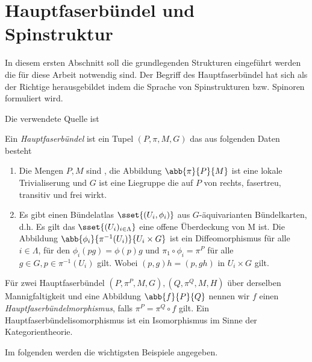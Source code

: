 

\section{Hauptfaserbündel und Spinstruktur}

In diesem ersten Abschnitt soll die grundlegenden Strukturen eingeführt werden die für diese Arbeit notwendig sind. Der Begriff des Hauptfaserbündel hat sich als der Richtige herausgebildet indem die Sprache von Spinstrukturen bzw. Spinoren formuliert wird.

Die verwendete Quelle ist \cite{baum09}

\begin{Def}[Hauptfaserbündel]
	Ein \textit{Hauptfaserbündel} ist ein Tupel $(P,\pi,M,G)$ das aus folgenden Daten besteht
	\begin{enumerate}[\textbullet]
		\item Die Mengen $P,M$ sind \mfgen, die Abbildung $ \abb{\pi}{P}{M} $ ist eine lokale Trivialiserung und $G$ ist eine Liegruppe
		die auf $P$ von rechts, fasertreu, transitiv und frei wirkt. 
		\item Es gibt einen Bündelatlas $\sset{(U_i,\phi_i)}$ aus $G$-äquivarianten Bündelkarten, d.h.
		Es gilt das $\sset{(U_i)_{i \in \Lambda}}$ eine offene
		Überdeckung von M ist. Die Abbildung $ \abb{\phi_i}{\pi^{-1}(U_i)}{U_i\times G} $ ist ein
		Diffeomorphismus für alle $i \in \Lambda $, für den $ \phi_i(pg) = \phi(p) g  $ und $ \pi_1 \circ \phi_i = \pi^P $ für alle $ g \in G, p \in \pi^{-1}(U_i) $ gilt. Wobei $ (p,g) h = (p,gh) $ in 
		$ U_i\times G $ gilt. 
	\end{enumerate}		
	Für zwei Hauptfaserbündel $(P,\pi^P,M,G),(Q,\pi^Q,M,H)$ 
	über derselben Mannigfaltigkeit und eine Abbildung $\abb{f}{P}{Q}$ nennen wir $f$ einen \textit{Hauptfaserbündelmorphismus}, falls $ \pi^P=\pi^Q \circ f $ gilt. Ein Hauptfaserbündelisomorphismus ist
	ein Isomorphismus im Sinne der Kategorientheorie.
\end{Def}

Im folgenden werden die wichtigsten Beispiele angegeben.

